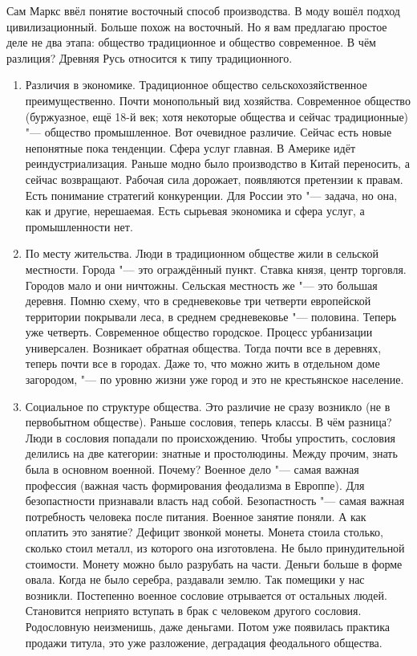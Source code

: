 Сам Маркс ввёл понятие восточный способ производства. В моду вошёл подход цивилизационный. Больше похож на восточный. Но я вам предлагаю простое деле не два этапа: общество традиционное и общество современное. В чём разлиция? Древняя Русь относится к типу традиционного.
\begin{enumerate}
\item Различия в экономике. Традиционное общество сельскохозяйственное преимущественно. Почти монопольный вид хозяйства. Современное общество (буржуазное, ещё 18-й век; хотя некоторые общества и сейчас традиционные) "--- общество промышленное. Вот очевидное различие. Сейчас есть новые непонятные пока тенденции. Сфера услуг главная. В Америке идёт реиндустриализация. Раньше модно было производство в Китай переносить, а сейчас возвращают. Рабочая сила дорожает, появляются претензии к правам. Есть понимание стратегий конкуренции. Для России это "--- задача, но она, как и другие, нерешаемая. Есть сырьевая экономика и сфера услуг, а промышленности нет.
\item По месту жительства. Люди в традиционном обществе жили в сельской местности. Города "--- это ограждённый пункт. Ставка князя, центр торговля. Городов мало и они ничтожны. Сельская местность же "--- это большая деревня. Помню схему, что в средневековье три четверти европейской территории покрывали леса, в среднем средневековье "--- половина. Теперь уже четверть. Современное общество городское. Процесс урбанизации универсален. Возникает обратная общества. Тогда почти все в деревнях, теперь почти все в городах. Даже то, что можно жить в отдельном доме загородом, "--- по уровню жизни уже город и это не крестьянское население. 
\item Социальное по структуре общества. Это различие не сразу возникло (не в первобытном обществе). Раньше сословия, теперь классы. В чём разница? Люди в сословия попадали по происхождению. Чтобы упростить, сословия делились на две категории: знатные и простолюдины. Между прочим, знать была в основном военной. Почему? Военное дело "--- самая важная профессия (важная часть формирования феодализма в Европпе). Для безопастности признавали власть над собой. Безопастность "--- самая важная потребность человека после питания. Военное занятие поняли. А как оплатить это занятие? Дефицит звонкой монеты. Монета стоила столько, сколько стоил металл, из которого она изготовлена. Не было принудительной стоимости. Монету можно было разрубать на части. Деньги больше в форме овала. Когда не было серебра, раздавали землю. Так помещики у нас возникли. Постепенно военное сословие отрывается от остальных людей. Становится неприято вступать в брак с человеком другого сословия. Родословную неизменишь, даже деньгами. Потом уже появилась практика продажи титула, это уже разложение, деградация феодального общества.


\end{enumerate}
